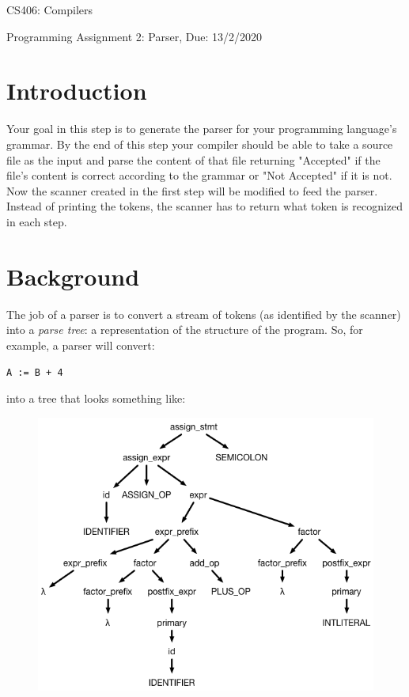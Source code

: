 \documentclass{article}
\begin{document}
\begin{center}{\LARGE CS406: Compilers} \end{center}
\begin{center}{\large Programming Assignment 2: Parser,  Due: 13/2/2020} \end{center}

\bigskip



\section{Introduction}
Your goal in this step is to generate the parser for your programming language's grammar. By the end of this step your compiler should be able to take a source file as the input and parse the content of  that file returning "Accepted" if the file's content is correct according to the grammar or "Not Accepted" if it is not. \\

Now the scanner created in the first step will be modified to feed the parser.  Instead of printing the tokens, the scanner has to return what token is recognized in each step. 

\section{Background}
The job of a parser is to convert a stream of tokens (as identified by the scanner) into a {\em parse tree}: a representation of the structure of the program. So, for example, a parser will convert:

\texttt{A := B + 4}

into a tree that looks something like:

\begin{figure}[H]
	\includegraphics[scale=0.5]{parsetree}
\end{figure}
\end{document}
